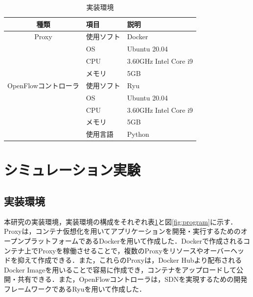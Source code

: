 \documentclass[Japanese]{dicomopapers}
\begin{document}
\begin{table}[!tb]
	\caption{実装環境}
	\label{tab:program}
	\centering
	\begin{tabular}{c|l|l}
		\hline
		種類                 & 項目       & 説明                  \\
		\hline \hline
		Proxy                & 使用ソフト & Docker                \\
		                     & OS         & Ubuntu 20.04          \\
		                     & CPU        & 3.60GHz Intel Core i9 \\
		                     & メモリ     & 5GB                   \\
		\hline
		OpenFlowコントローラ & 使用ソフト & Ryu                   \\
		                     & OS         & Ubuntu 20.04          \\
		                     & CPU        & 3.60GHz Intel Core i9 \\
		                     & メモリ     & 5GB                   \\
		                     & 使用言語   & Python                \\
		\hline
	\end{tabular}
\end{table}

\section{シミュレーション実験}
\subsection{実装環境}
本研究の実装環境，実装環境の構成をそれぞれ表\ref{tab:program}と図\ref{fig:program}に示す．Proxyは，コンテナ仮想化を用いてアプリケーションを開発・実行するためのオープンプラットフォームであるDockerを用いて作成した．Dockerで作成されるコンテナ上でProxyを稼働させることで，複数のProxyをリソースやオーバーヘッドを抑えて作成できる．また，これらのProxyは，Docker Hubより配布されるDocker Imageを用いることで容易に作成でき，コンテナをアップロードして公開・共有できる．また，OpenFlowコントローラは，SDNを実現するための開発フレームワークであるRyuを用いて作成した．
\end{document}
